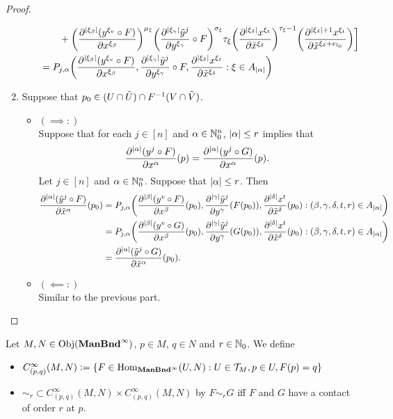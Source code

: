 \documentclass{book}
\begin{document}
\begin{proof}
\begin{enumerate}
\begin{itemize}
\begin{align*}
				& \quad \quad + \bigg(\frac{\partial^{|\xi_{\beta}|} (y^{\xi_v} \circ F)}{\partial x^{\xi_{\beta}}} \bigg)^{\mu_{\xi}} \bigg( \frac{\partial^{|\xi_{\gamma}|} \tilde{y}^j}{\partial y^{\xi_{\gamma}}} \circ F \bigg)^{\sigma_{\xi}} \tau_{\xi} \bigg( \frac{\partial^{|\xi_{\delta}|} x^{\xi_t}}{\partial \tilde{x}^{\xi_{\delta}}} \bigg)^{\tau_{\xi} - 1} \bigg(  \frac{\partial^{|\xi_{\delta}| + 1} x^{\xi_t}}{\partial \tilde{x}^{\xi_{\delta} + e_{l_0}}} \bigg) 
				\bigg] \\
				& = P_{j, \alpha}\bigg( \frac{\partial^{|\xi_{\beta}|} (y^{\xi_v} \circ F)}{\partial x^{\xi_{\beta}}},  \frac{\partial^{|\xi_{\gamma}|} \tilde{y}^j}{\partial y^{\xi_{\gamma}}} \circ F, \frac{\partial^{|\xi_{\delta}|} x^{\xi_t}}{\partial \tilde{x}^{\xi_{\delta}}} : \xi \in A_{|\alpha|} \bigg)
			\end{align*}  	
		\end{itemize}
		\item Suppose that $p_0 \in (U \cap \tilde{U}) \cap F^{-1}(V \cap \tilde{V})$.
		\begin{itemize}
			\item $(\implies:)$ \\ 
			Suppose that for each $j \in [n]$ and $\alpha \in \mathbb{N}_0^n$, $|\alpha| \leq r$ implies that 
			$$\frac{\partial^{|\alpha|} (y^j \circ F)}{\partial x^{\alpha}}(p) =  \frac{\partial^{|\alpha|} (y^j \circ G)}{\partial x^{\alpha}}(p).$$
			Let $j \in [n]$ and $\alpha \in \mathbb{N}_0^n$. Suppose that $|\alpha| \leq r$. Then
			\begin{align*}
				\frac{\partial^{|\alpha|} (\tilde{y}^j \circ F)}{\partial \tilde{x}^{\alpha}}(p_0) 
				& = P_{j, \alpha}\bigg( \frac{\partial^{|\beta|} (y^{v} \circ F)}{\partial x^{\beta}}(p_0),  \frac{\partial^{|\gamma|} \tilde{y}^j}{\partial y^{\gamma}} (F(p_0)), \frac{\partial^{|\delta|} x^t}{\partial \tilde{x}^{\delta}}(p_0) : (\beta, \gamma, \delta, t, r) \in A_{|\alpha|} \bigg) \\
				& = P_{j, \alpha}\bigg( \frac{\partial^{|\beta|} (y^{v} \circ G)}{\partial x^{\beta}}(p_0),  \frac{\partial^{|\gamma|} \tilde{y}^j}{\partial y^{\gamma}} (G(p_0)), \frac{\partial^{|\delta|} x^t}{\partial \tilde{x}^{\delta}}(p_0) : (\beta, \gamma, \delta, t, r) \in A_{|\alpha|} \bigg) \\
				& =  \frac{\partial^{|\alpha|} (\tilde{y}^j \circ G)}{\partial \tilde{x}^{\alpha}}(p_0).
			\end{align*}
			\item $(\impliedby:)$ \\
			Similar to the previous part.
		\end{itemize} 
	\end{enumerate}
\end{proof}

\begin{defn}
	Let $M, N \in \operatorname{Obj}(\operatorname*{\text{\textbf{ManBnd}}^{\infty}})$, $p \in M$, $q \in N$ and $r \in \mathbb{N}_0$. We define 
	\begin{itemize}
		\item $C^{\infty}_{(p,q)}(M, N) \vcentcolon= \{ F \in \operatorname{Hom}_{\operatorname*{\text{\textbf{ManBnd}}^{\infty}}}(U, N): U \in \mathcal{T}_M, p \in U, F(p) = q\}$
		\item ${\sim_r} \subset C^{\infty}_{(p,q)}(M, N) \times C^{\infty}_{(p,q)}(M, N)$ by $F {\sim_r} G$ iff $F$ and $G$ have a contact of order $r$ at $p$.  
	\end{itemize}
\end{defn}
\end{document}
